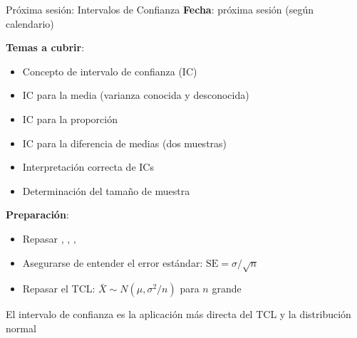 \documentclass[aspectratio=169, 11pt]{beamer}
\begin{document}
\begin{frame}{Próxima sesión: Intervalos de Confianza}
\textbf{Fecha}: próxima sesión (según calendario)

\textbf{Temas a cubrir}:
\begin{itemize}
\item Concepto de intervalo de confianza (IC)
\item IC para la media (varianza conocida y desconocida)
\item IC para la proporción
\item IC para la diferencia de medias (dos muestras)
\item Interpretación correcta de ICs
\item Determinación del tamaño de muestra
\end{itemize}

\vspace{1em}
\textbf{Preparación}:
\begin{itemize}
\item Repasar , , , 
\item Asegurarse de entender el error estándar: $\text{SE} = \sigma/\sqrt{n}$
\item Repasar el TCL: $\bar{X} \sim N(\mu, \sigma^2/n)$ para $n$ grande
\end{itemize}

\vspace{0.5em}
\alert{El intervalo de confianza es la aplicación más directa del TCL y la distribución normal}
\end{frame}
\end{document}
